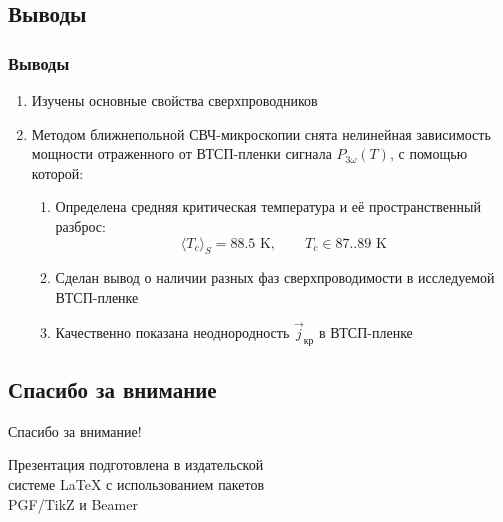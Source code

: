\subsection{Выводы}
\begin{frame}
	\frametitle{Выводы}
	\begin{enumerate}
		\item Изучены основные свойства сверхпроводников
		\item Методом ближнепольной СВЧ-микроскопии снята нелинейная зависимость мощности отраженного от ВТСП-пленки сигнала $P_{3\omega}(T)$, с помощью которой:
		\begin{enumerate}
		\item Определена средняя критическая температура и её пространственный разброс: $$\langle T_c\rangle_{S}=88.5\text{ K},\qquad T_c\in 87..89 \text{ K}$$
		\item Сделан вывод о наличии разных фаз сверхпроводимости в исследуемой ВТСП-пленке
		\item Качественно показана неоднородность $\vec{j}_\text{кр}$ в ВТСП-пленке
		\end{enumerate}
	\end{enumerate}
\end{frame}
\subsection{Спасибо за внимание}
\begin{frame}[plain]
	\vspace{4cm}
	\begin{center}
		\Huge
		Спасибо за внимание!
	\end{center}
	\vspace{2.5cm}
	\begin{center}
		\color{black!60!white}
		Презентация подготовлена в издательской \\
		системе LaTeX с использованием пакетов \\
		PGF/TikZ и Beamer
	\end{center}
\end{frame}
